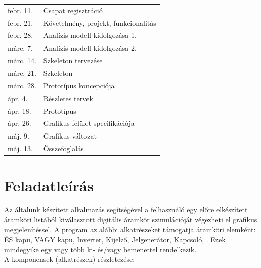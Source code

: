 \begin{tabular}{l | l}
febr. 11. & Csapat regisztráció \\
febr. 21. & Követelmény, projekt, funkcionalitás \\
febr. 28. & Analízis modell kidolgozása 1. \\
márc. 7. & Analízis modell kidolgozása 2. \\
márc. 14. & Szkeleton tervezése \\
márc. 21. & Szkeleton \\
márc. 28. & Prototípus koncepciója \\
ápr.  4. & Részletes tervek \\
ápr. 18. & Prototípus \\
ápr. 26. & Grafikus felület specifikációja \\
máj. 9. & Grafikus változat \\
máj. 13. & Összefoglalás
\end{tabular}

\section{Feladatleírás}
\label{sec:taskdesc}

Az általunk készített alkalmazás segítségével a felhasználó egy előre elkészített áramköri listából kiválasztott digitális áramkör szimulációját végezheti el grafikus megjelenítéssel. A program az alábbi alkatrészeket támogatja áramköri elemként: ÉS kapu, VAGY kapu, Inverter, Kijelző, Jelgenerátor, Kapcsoló, . Ezek mindegyike egy vagy több ki- és/vagy bemenettel rendelkezik.\\

\noindent A komponensek (alkatrészek) részletezése:

